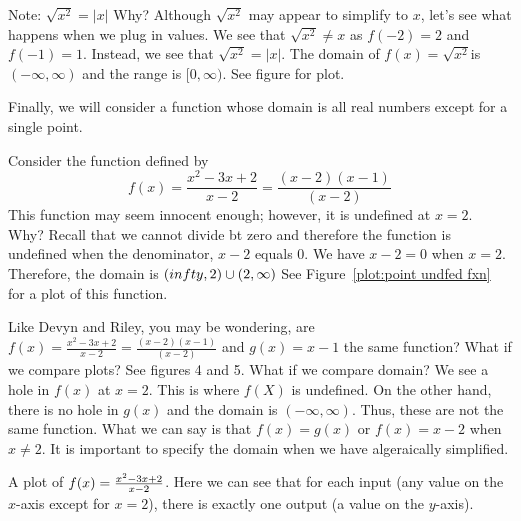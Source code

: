 \documentclass{ximera}
\begin{document}
Note: $\sqrt{x^2} = |x|$  Why?  Although $\sqrt{x^2}$ may appear to simplify to $x$, let's see what happens when we plug in values.
We see that $\sqrt{x^2}\ne x$ as $f(-2)=2$ and $f(-1)=1$.  Instead, we see that $\sqrt{x^2} = |x|$.  The domain of $f(x)=\sqrt{x^2}$is $(-\infty,\infty)$ and the range is $[0,\infty)$.  See figure for plot.


Finally, we will consider a function whose domain is all real numbers
except for a single point.

\begin{example}
Consider the function defined by 
\[
f(x) = \frac{x^2 - 3x + 2}{x-2} = \frac{(x-2)(x-1)}{(x-2)}
\]
This function may seem innocent enough; however, it is undefined at
$x=2$. Why? Recall that we cannot divide bt zero and therefore the function is undefined when the denominator, $x-2$ equals $0$.  We have $x-2 = 0$ when $x=2$.  Therefore, the domain is $(\-infty ,2)\cup (2,\infty )$  
See Figure~\ref{plot:point undfed fxn} for a plot of this function.
\end{example}

Like Devyn and Riley, you may be wondering, are $f(x) = \frac{x^2 - 3x + 2}{x-2} = \frac{(x-2)(x-1)}{(x-2)}$ and $g(x) = x-1$ the same function?  What if we compare plots?  See figures 4 and 5.  What if we compare domain?  We see a hole in $f(x)$ at $x=2$.  This is where $f(X)$ is undefined.  On the other hand, there is no hole in $g(x)$ and the domain is $(-\infty ,\infty )$.  Thus, these are not the same function.  What we can say is that $f(x)=g(x)$ or $f(x)=x-2$ when $x \ne 2$.  It is important to specify the domain when we have algeraically simplified. 



\begin{marginfigure}[0in]
\caption{A plot of $f(x)=\protect\frac{x^2 - 3x + 2}{x-2}$. Here we
  can see that for each input (any value on the $x$-axis except for
  $x=2$), there is exactly one output (a value on the $y$-axis).}
\label{plot:point undfed fxn}
\end{marginfigure}
\end{document}
